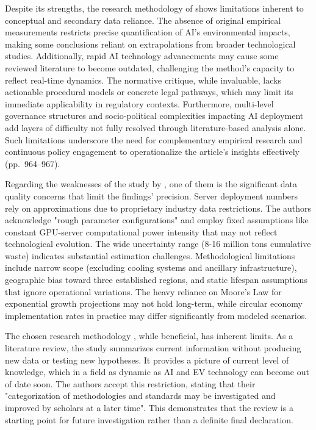 \documentclass[a4paper, 12pt]{article}
\begin{document}
\par Despite its strengths, the research methodology of \citet{Zhuk2023} shows limitations inherent to conceptual and secondary data reliance. The absence of original empirical measurements restricts precise quantification of AI’s environmental impacts, making some conclusions reliant on extrapolations from broader technological studies. Additionally, rapid AI technology advancements may cause some reviewed literature to become outdated, challenging the method’s capacity to reflect real-time dynamics. The normative critique, while invaluable, lacks actionable procedural models or concrete legal pathways, which may limit its immediate applicability in regulatory contexts. Furthermore, multi-level governance structures and socio-political complexities impacting AI deployment add layers of difficulty not fully resolved through literature-based analysis alone. Such limitations underscore the need for complementary empirical research and continuous policy engagement to operationalize the article’s insights effectively (pp.~964--967).\hfill \break
\par Regarding the weaknesses of the study by \citet{wang_2024_ewaste}, one of them is the significant data quality concerns that limit the findings' precision. Server deployment numbers rely on approximations due to proprietary industry data restrictions. The authors acknowledge "rough parameter configurations" and employ fixed assumptions like constant GPU-server computational power intensity that may not reflect technological evolution. The wide uncertainty range (8-16 million tons cumulative waste) indicates substantial estimation challenges. Methodological limitations include narrow scope (excluding cooling systems and ancillary infrastructure), geographic bias toward three established regions, and static lifespan assumptions that ignore operational variations. The heavy reliance on Moore's Law for exponential growth projections may not hold long-term, while circular economy implementation rates in practice may differ significantly from modeled scenarios. \hfill \break
\par The chosen research methodology \citet{M.rauf2024}, while beneficial, has inherent limits.  As a literature review, the study summarizes current information without producing new data or testing new hypotheses.  It provides a picture of current level of knowledge, which in a field as dynamic as AI and EV technology can become out of date soon.  The authors accept this restriction, stating that their "categorization of methodologies and standards may be investigated and improved by scholars at a later time".  This demonstrates that the review is a starting point for future investigation rather than a definite final declaration. \hfill \break
\end{document}
